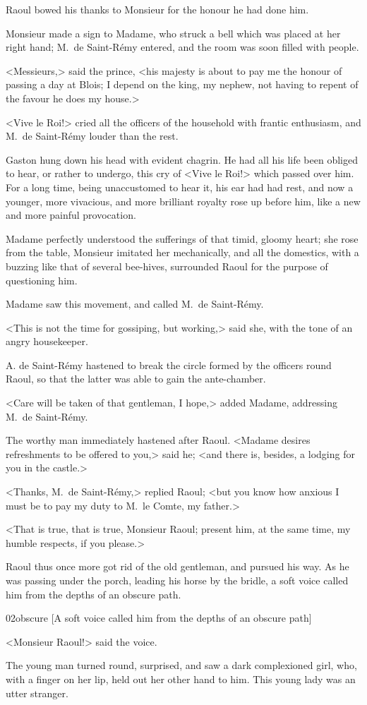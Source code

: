 Raoul bowed his thanks to Monsieur for the honour he had done him.

Monsieur made a sign to Madame, who struck a bell which was placed at her right hand; M.~de Saint-Rémy entered, and the room was soon filled with people.

<Messieurs,> said the prince, <his majesty is about to pay me the honour of passing a day at Blois; I depend on the king, my nephew, not having to repent of the favour he does my house.>

<Vive le Roi!> cried all the officers of the household with frantic enthusiasm, and M.~de Saint-Rémy louder than the rest.

Gaston hung down his head with evident chagrin. He had all his life been obliged to hear, or rather to undergo, this cry of <Vive le Roi!> which passed over him. For a long time, being unaccustomed to hear it, his ear had had rest, and now a younger, more vivacious, and more brilliant royalty rose up before him, like a new and more painful provocation.

Madame perfectly understood the sufferings of that timid, gloomy heart; she rose from the table, Monsieur imitated her mechanically, and all the domestics, with a buzzing like that of several bee-hives, surrounded Raoul for the purpose of questioning him.

Madame saw this movement, and called M.~de Saint-Rémy.

<This is not the time for gossiping, but working,> said she, with the tone of an angry housekeeper.

A. de Saint-Rémy hastened to break the circle formed by the officers round Raoul, so that the latter was able to gain the ante-chamber.

<Care will be taken of that gentleman, I hope,> added Madame, addressing M.~de Saint-Rémy.

The worthy man immediately hastened after Raoul. <Madame desires refreshments to be offered to you,> said he; <and there is, besides, a lodging for you in the castle.>

<Thanks, M.~de Saint-Rémy,> replied Raoul; <but you know how anxious I must be to pay my duty to M.~le Comte, my father.>

<That is true, that is true, Monsieur Raoul; present him, at the same time, my humble respects, if you please.>

Raoul thus once more got rid of the old gentleman, and pursued his way. As he was passing under the porch, leading his horse by the bridle, a soft voice called him from the depths of an obscure path.

\begin{bwbigpic}
	[\basicscale] 
	{02obscure}
	[A soft voice called him from the depths of an obscure path]
\end{bwbigpic}

<Monsieur Raoul!> said the voice.

The young man turned round, surprised, and saw a dark complexioned girl, who, with a finger on her lip, held out her other hand to him. This young lady was an utter stranger. 